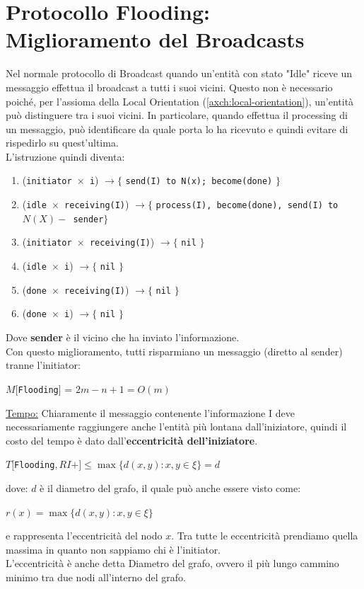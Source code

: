 \section{Protocollo Flooding: Miglioramento del Broadcasts}
Nel normale protocollo di Broadcast quando un'entità con stato "Idle" riceve un
messaggio effettua il broadcast a tutti i suoi vicini. Questo non è necessario
poiché, per l'assioma della Local Orientation (\ref{axch:local-orientation}), un'entità può distinguere tra i
suoi vicini. In particolare, quando effettua il processing di un messaggio, può
identificare da quale porta lo ha ricevuto e quindi evitare di rispedirlo su
quest'ultima.\\
L'istruzione quindi diventa:

\begin{enumerate}
    \item (\texttt{initiator $\times$ i}) $\rightarrow \lbrace$ \texttt{send(I) to N(x);
              become(done)} $\rbrace$
    \item (\texttt{idle $\times$ receiving(I)}) $\rightarrow \lbrace$ \texttt{process(I),
              become(done), send(I) to $N(X) -$ {sender}}$\rbrace$
    \item (\texttt{initiator $\times$ receiving(I)}) $\rightarrow \lbrace$ \texttt{nil}
          $\rbrace$
    \item (\texttt{idle $\times$ i}) $\rightarrow \lbrace$ \texttt{nil} $\rbrace$
    \item (\texttt{done $\times$ receiving(I)}) $\rightarrow \lbrace$ \texttt{nil}
          $\rbrace$
    \item (\texttt{done $\times$ i}) $\rightarrow \lbrace$ \texttt{nil} $\rbrace$
\end{enumerate}
Dove \textbf{sender} è il vicino che ha inviato l'informazione.\\
Con questo miglioramento, tutti risparmiano un messaggio (diretto al sender)
tranne l'initiator:
\begin{center}
    $M[$\texttt{Flooding}] = $2m-n+1=O(m)$
\end{center}

\underline{Tempo:}
Chiaramente il messaggio contenente l'informazione I deve necessariamente
raggiungere anche l'entità più lontana dall'iniziatore, quindi il costo del
tempo è dato dall'\textbf{eccentricità dell'iniziatore}.
\begin{center}
    $T[$\texttt{Flooding}$, RI+] \leq \max \lbrace d(x,y) : x, y \in \xi \rbrace =
        d$
\end{center}
dove: $d$ è il diametro del grafo, il quale può anche essere visto come:
\begin{center}
    $r(x) = \max \lbrace d(x, y) : x, y \in \xi \rbrace$
\end{center}
e rappresenta l'eccentricità del nodo $x$. Tra tutte le eccentricità prendiamo
quella massima in quanto non sappiamo chi è l'initiator.\\
L'eccentricità è anche detta Diametro del grafo, ovvero il più lungo cammino
minimo tra due nodi all'interno del grafo.

